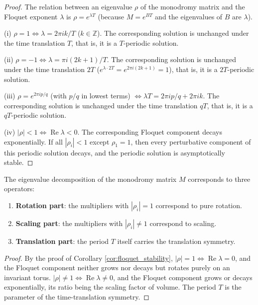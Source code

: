 \begin{proof}
The relation between an eigenvalue $\rho$ of the monodromy matrix and the Floquet exponent $\lambda$ is $\rho = e^{\lambda T}$ (because $M = e^{BT}$ and the eigenvalues of $B$ are $\lambda$).

(i) $\rho = 1 \iff \lambda = 2\pi i k/T$ ($k \in \mathbb{Z}$). The corresponding solution is unchanged under the time translation $T$, that is, it is a $T$-periodic solution.

(ii) $\rho = -1 \iff \lambda = \pi i(2k+1)/T$. The corresponding solution is unchanged under the time translation $2T$ ($e^{\lambda \cdot 2T} = e^{2\pi i(2k+1)} = 1$), that is, it is a $2T$-periodic solution.

(iii) $\rho = e^{2\pi i p/q}$ (with $p/q$ in lowest terms) $\iff \lambda T = 2\pi i p/q + 2\pi i k$. The corresponding solution is unchanged under the time translation $qT$, that is, it is a $qT$-periodic solution.

(iv) $|\rho| < 1 \iff \operatorname{Re}\lambda < 0$. The corresponding Floquet component decays exponentially. If all $|\rho_i| < 1$ except $\rho_1 = 1$, then every perturbative component of this periodic solution decays, and the periodic solution is asymptotically stable.
\end{proof}

\begin{proposition}\label{prop:floquet_operator}
The eigenvalue decomposition of the monodromy matrix $M$ corresponds to three operators:
\begin{enumerate}[label=(\roman*)]
    \item \textbf{Rotation part}: the multipliers with $|\rho_i| = 1$ correspond to pure rotation.
    \item \textbf{Scaling part}: the multipliers with $|\rho_i| \neq 1$ correspond to scaling.
    \item \textbf{Translation part}: the period $T$ itself carries the translation symmetry.
\end{enumerate}
\end{proposition}

\begin{proof}
By the proof of Corollary \ref{cor:floquet_stability}, $|\rho| = 1 \iff \operatorname{Re}\lambda = 0$, and the Floquet component neither grows nor decays but rotates purely on an invariant torus. $|\rho| \neq 1 \iff \operatorname{Re}\lambda \neq 0$, and the Floquet component grows or decays exponentially, its ratio being the scaling factor of volume. The period $T$ is the parameter of the time-translation symmetry.
\end{proof}


